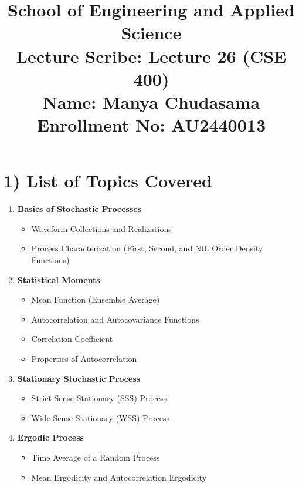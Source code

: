 \documentclass[11pt]{article}
\title{
    \Large \textbf{School of Engineering and Applied Science} \\
    \vspace{0.5cm}
    \large \textbf{Lecture Scribe}: Lecture 26 (CSE 400) \\
    \vspace{0.2cm}
    \normalsize \textbf{Name:} Manya Chudasama\\
    \vspace{0.2cm}
    \normalsize \textbf{Enrollment No:} AU2440013
}
\date{}
\begin{document}
\maketitle

\section*{1) List of Topics Covered}
\begin{enumerate}
    \item \textbf{Basics of Stochastic Processes}
    \begin{itemize}
        \item Waveform Collections and Realizations
        \item Process Characterization (First, Second, and Nth Order Density Functions)
    \end{itemize}
    \item \textbf{Statistical Moments}
    \begin{itemize}
        \item Mean Function (Ensemble Average)
        \item Autocorrelation and Autocovariance Functions
        \item Correlation Coefficient
        \item Properties of Autocorrelation
    \end{itemize}
    \item \textbf{Stationary Stochastic Process}
    \begin{itemize}
        \item Strict Sense Stationary (SSS) Process
        \item Wide Sense Stationary (WSS) Process
    \end{itemize}
    \item \textbf{Ergodic Process}
    \begin{itemize}
        \item Time Average of a Random Process
        \item Mean Ergodicity and Autocorrelation Ergodicity
    \end{itemize}
\end{enumerate}
\end{document}
